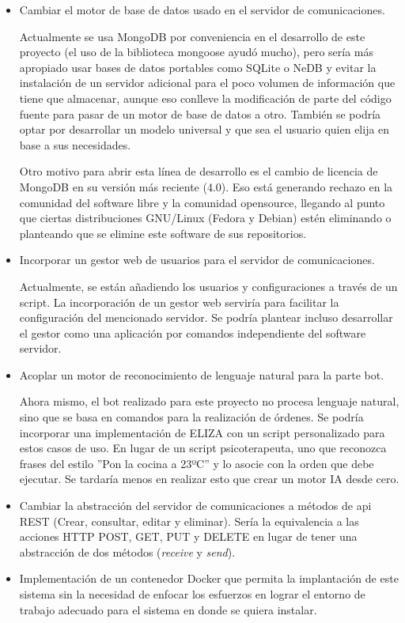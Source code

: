 \documentclass[spanish,12pt, a4paper, twoside]{paper}
\begin{document}
\begin{itemize}
\item Cambiar el motor de base de datos usado en el servidor de comunicaciones. 

Actualmente se usa MongoDB por conveniencia en el desarrollo de este proyecto (el uso de la biblioteca mongoose ayudó mucho), pero sería más apropiado usar bases de datos portables como SQLite o NeDB  y evitar la instalación de un servidor adicional para el poco volumen de información que tiene que almacenar, aunque eso conlleve la modificación de parte del código fuente para pasar de un motor de base de datos a otro. También se podría optar por desarrollar un modelo universal y que sea el usuario quien elija en base a sus necesidades.

Otro motivo para abrir esta línea de desarrollo es el cambio de licencia de MongoDB en su versión más reciente (4.0). Eso está generando rechazo en la comunidad del software libre y la comunidad opensource, llegando al punto que ciertas distribuciones GNU/Linux (Fedora y Debian) estén eliminando o planteando que se elimine este software de sus repositorios. \cite{MongoDBLicense} \cite{MongoDBRemoveRequest}

\item Incorporar un gestor web de usuarios para el servidor de comunicaciones.

Actualmente, se están añadiendo los usuarios y configuraciones a través de un script. La incorporación de un gestor web serviría para facilitar la configuración del mencionado servidor. Se podría plantear incluso desarrollar el gestor como una aplicación por comandos independiente del software servidor.

\item Acoplar un motor de reconocimiento de lenguaje natural para la parte bot.

Ahora mismo, el bot realizado para este proyecto no procesa lenguaje natural, sino que se basa en comandos para la realización de órdenes. Se podría incorporar una implementación de ELIZA con un script personalizado para estos casos de uso. En lugar de un script psicoterapeuta, uno que reconozca frases del estilo ''Pon la cocina a 23ºC'' y lo asocie con la orden que debe ejecutar. Se tardaría menos en realizar esto que crear un motor IA desde cero.

\item Cambiar la abstracción del servidor de comunicaciones a métodos de api REST (Crear, consultar, editar y eliminar). Sería la equivalencia a las acciones HTTP POST, GET, PUT y DELETE en lugar de tener una abstracción de dos métodos (\emph{receive} y \emph{send}).

\item Implementación de un contenedor Docker que permita la implantación de este sistema sin la necesidad de enfocar los esfuerzos en lograr el entorno de trabajo adecuado para el sistema en donde se quiera instalar.
\end{itemize}
\end{document}
